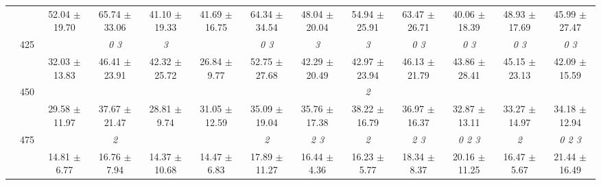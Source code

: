 \begin{table}[h]
{\begin{tabular}{
        ccccccccccccc}
 & & 52.04 $\pm$ 19.70& 65.74 $\pm$ 33.06& 41.10 $\pm$ 19.33& 41.69 $\pm$ 16.75& 64.34 $\pm$ 34.54& 48.04 $\pm$ 20.04& 54.94 $\pm$ 25.91& 63.47 $\pm$ 26.71& 40.06 $\pm$ 18.39& 48.93 $\pm$ 17.69& 45.99 $\pm$ 27.47 \\ 
 & \multirow{2}{*}{425}& \cellcolor[HTML]{EFEFEF} & \cellcolor[HTML]{EFEFEF} \textit{ 0 3 }& \cellcolor[HTML]{EFEFEF} \textit{ 3 }& \cellcolor[HTML]{EFEFEF} & \cellcolor[HTML]{EFEFEF} \textit{ 0 3 }& \cellcolor[HTML]{EFEFEF} \textit{ 3 }& \cellcolor[HTML]{EFEFEF} \textit{ 3 }& \cellcolor[HTML]{EFEFEF} \textit{ 0 3 }& \cellcolor[HTML]{EFEFEF} \textit{ 0 3 }& \cellcolor[HTML]{EFEFEF} \textit{ 0 3 }& \cellcolor[HTML]{EFEFEF} \textit{ 0 3 } \\ 
 & & \cellcolor[HTML]{EFEFEF} 32.03 $\pm$ 13.83& \cellcolor[HTML]{EFEFEF} 46.41 $\pm$ 23.91& \cellcolor[HTML]{EFEFEF} 42.32 $\pm$ 25.72& \cellcolor[HTML]{EFEFEF} 26.84 $\pm$ 9.77& \cellcolor[HTML]{EFEFEF} 52.75 $\pm$ 27.68& \cellcolor[HTML]{EFEFEF} 42.29 $\pm$ 20.49& \cellcolor[HTML]{EFEFEF} 42.97 $\pm$ 23.94& \cellcolor[HTML]{EFEFEF} 46.13 $\pm$ 21.79& \cellcolor[HTML]{EFEFEF} 43.86 $\pm$ 28.41& \cellcolor[HTML]{EFEFEF} 45.15 $\pm$ 23.13& \cellcolor[HTML]{EFEFEF} 42.09 $\pm$ 15.59 \\ 
 & \multirow{2}{*}{450}& & & & & & & \textit{ 2 }& & & &  \\ 
 & & 29.58 $\pm$ 11.97& 37.67 $\pm$ 21.47& 28.81 $\pm$ 9.74& 31.05 $\pm$ 12.59& 35.09 $\pm$ 19.04& 35.76 $\pm$ 17.38& 38.22 $\pm$ 16.79& 36.97 $\pm$ 16.37& 32.87 $\pm$ 13.11& 33.27 $\pm$ 14.97& 34.18 $\pm$ 12.94 \\ 
 & \multirow{2}{*}{475}& \cellcolor[HTML]{EFEFEF} & \cellcolor[HTML]{EFEFEF} \textit{ 2 }& \cellcolor[HTML]{EFEFEF} & \cellcolor[HTML]{EFEFEF} & \cellcolor[HTML]{EFEFEF} \textit{ 2 }& \cellcolor[HTML]{EFEFEF} \textit{ 2 3 }& \cellcolor[HTML]{EFEFEF} \textit{ 2 }& \cellcolor[HTML]{EFEFEF} \textit{ 2 3 }& \cellcolor[HTML]{EFEFEF} \textit{ 0 2 3 }& \cellcolor[HTML]{EFEFEF} \textit{ 2 }& \cellcolor[HTML]{EFEFEF} \textit{ 0 2 3 } \\ 
 & & \cellcolor[HTML]{EFEFEF} 14.81 $\pm$ 6.77& \cellcolor[HTML]{EFEFEF} 16.76 $\pm$ 7.94& \cellcolor[HTML]{EFEFEF} 14.37 $\pm$ 10.68& \cellcolor[HTML]{EFEFEF} 14.47 $\pm$ 6.83& \cellcolor[HTML]{EFEFEF} 17.89 $\pm$ 11.27& \cellcolor[HTML]{EFEFEF} 16.44 $\pm$ 4.36& \cellcolor[HTML]{EFEFEF} 16.23 $\pm$ 5.77& \cellcolor[HTML]{EFEFEF} 18.34 $\pm$ 8.37& \cellcolor[HTML]{EFEFEF} 20.16 $\pm$ 11.25& \cellcolor[HTML]{EFEFEF} 16.47 $\pm$ 5.67& \cellcolor[HTML]{EFEFEF} 21.44 $\pm$ 16.49 \\ 

\end{tabular}}
\end{table}
